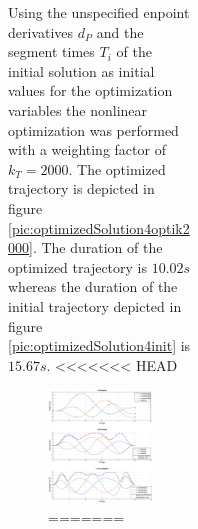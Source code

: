 \begin{figure}[h]
\begin{figure}[H]
\begin{figure}[H]
\begin{figure}[H]
Using the unspecified enpoint derivatives $d_P$ and the segment times $T_i$ of the initial solution as initial values for the optimization variables the nonlinear optimization was performed with a weighting factor of $k_T = 2000$. The optimized trajectory is depicted in figure \ref{pic:optimizedSolution4optik2000}. The duration of the optimized trajectory is $10.02s$ whereas the duration of the initial trajectory depicted in figure \ref{pic:optimizedSolution4init} is $15.67s$.
<<<<<<< HEAD


\begin{figure}[H]
   \centering
   \includegraphics[trim = 35mm 30mm 30mm 15mm,clip,width=1\textwidth]{pics/4SegOpti10s01k2000.eps}
=======
\vspace*{2.65\baselineskip}


\end{figure}
\end{figure}
\end{figure}
\end{figure}
\end{figure}
